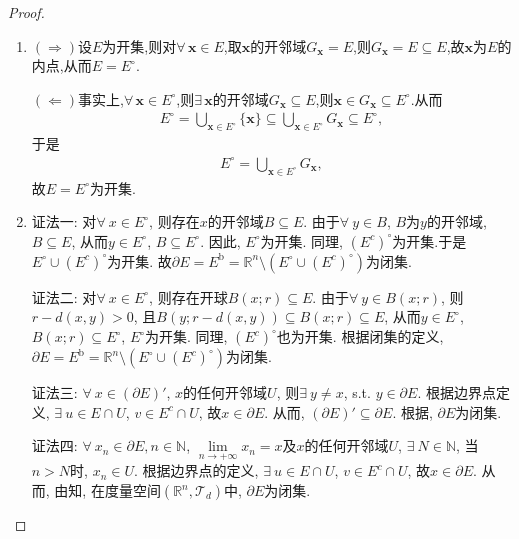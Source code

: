 \documentclass[../../main.tex]{subfiles}%
\begin{document}
\begin{proof}
\begin{enumerate}[(1)]
\item $(\Rightarrow)$设$E$为开集,则对$\forall\,\boldsymbol{x}\in E$,取$\boldsymbol{x}$的开邻域$G_{\boldsymbol{x}}=E$,则$G_{\boldsymbol{x}}=E\subseteq E$,故$\boldsymbol{x}$为$E$的内点,从而$E=E^\circ$.

$(\Leftarrow)$事实上,$\forall\,\boldsymbol{x}\in E^\circ$,则$\exists\,\boldsymbol{x}$的开邻域$G_{\boldsymbol{x}}\subseteq E$,则$\boldsymbol{x}\in G_{\boldsymbol{x}}\subseteq E^\circ$.从而
\begin{align*}
E^\circ=\bigcup_{\boldsymbol{x}\in E^\circ}\{\boldsymbol{x}\}\subseteq\bigcup_{\boldsymbol{x}\in E^\circ}G_{\boldsymbol{x}}\subseteq E^\circ,
\end{align*}
于是
\begin{align*}
E^\circ=\bigcup_{\boldsymbol{x}\in E^\circ}G_{\boldsymbol{x}},
\end{align*}
故$E=E^\circ$为开集.

\item {\color{blue}证法一:}
对$\forall\ x \in E^\circ$, 则存在$x$的开邻域$B \subseteq E$. 由于$\forall\ y \in B$, $B$为$y$的开邻域, $B \subseteq E$, 从而$y \in E^\circ$, $B \subseteq E^\circ$. 因此, $E^\circ$为开集. 同理, $(E^c)^\circ$为开集.于是$E^\circ \cup (E^c)^\circ$为开集. 故$\partial E = E^{\mathrm{b}} = \mathbb{R}^n \setminus (E^\circ \cup (E^c)^\circ)$为闭集.

{\color{blue}证法二:}
对$\forall\ x \in E^\circ$, 则存在开球$B(x; r) \subseteq E$. 由于$\forall\ y \in B(x; r)$, 则$r - d(x,y) > 0$, 且$B(y; r - d(x,y)) \subseteq B(x; r) \subseteq E$, 从而$y \in E^\circ$, $B(x; r) \subseteq E^\circ$, $E^\circ$为开集. 同理, $(E^c)^\circ$也为开集. 根据闭集的定义, $\partial E = E^{\mathrm{b}} = \mathbb{R}^n \setminus (E^\circ \cup (E^c)^\circ)$为闭集.

{\color{blue}证法三:}
$\forall\ x \in (\partial E)'$, $x$的任何开邻域$U$, 则$\exists\ y \neq x$, s.t. $y \in \partial E$. 根据边界点定义, $\exists\ u \in E \cap U$, $v \in E^c \cap U$, 故$x \in \partial E$. 从而, $(\partial E)' \subseteq \partial E$. 根据, $\partial E$为闭集.

{\color{blue}证法四:}
$\forall\ x_n \in \partial E, n \in \mathbb{N}$, $\lim\limits_{n \to +\infty} x_n = x$及$x$的任何开邻域$U$, $\exists\ N \in \mathbb{N}$, 当$n > N$时, $x_n \in U$. 根据边界点的定义, $\exists\ u \in E \cap U$, $v \in E^c \cap U$, 故$x \in \partial E$. 从而, 由知, 在度量空间$(\mathbb{R}^n, \mathcal{T}_{d})$中, $\partial E$为闭集.


\end{enumerate}
\end{proof}
\end{document}
